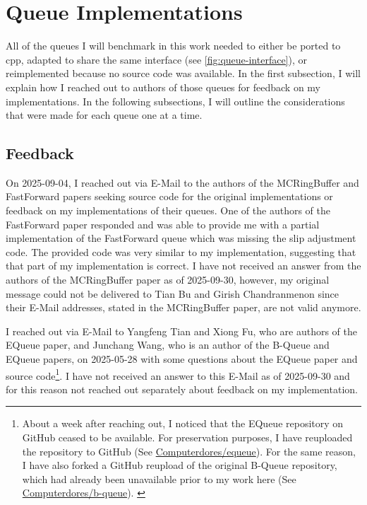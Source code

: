 \chapter{Queue Implementations}
All of the queues I will benchmark in this work needed to either be ported to cpp, adapted to share the same
interface (see \autoref{fig:queue-interface}), or reimplemented because no source code was available.
In the first subsection, I will explain how I reached out to authors of those queues for feedback on my implementations.
In the following subsections, I will outline the considerations that were made for each queue one at a time.

\section{Feedback}
On 2025-09-04, I reached out via E-Mail to the authors of the MCRingBuffer and FastForward papers seeking
source code for the original implementations or feedback on my implementations of their queues.
One of the authors of the FastForward paper responded and was able to provide me with a partial
implementation of the FastForward queue which was missing the slip adjustment code.
The provided code was very similar to my implementation, suggesting that that part of my implementation is correct.
I have not received an answer from the authors of the MCRingBuffer paper as of 2025-09-30, however, my
original message could not be delivered to Tian Bu and Girish Chandranmenon since their E-Mail addresses,
stated in the MCRingBuffer paper, are not valid anymore.

I reached out via E-Mail to Yangfeng Tian and Xiong Fu, who are authors of the EQueue paper, and Junchang
Wang, who is an author of the B-Queue and EQueue papers, on 2025-05-28 with some questions about the EQueue
paper and source code\footnote{About a week after reaching out,
    I noticed that the EQueue repository on GitHub ceased to be available.
    For preservation purposes, I have reuploaded the repository to GitHub (See
    \href{https://github.com/Computerdores/equeue}{Computerdores/equeue}).
    For the same reason, I have also forked a GitHub reupload of the original B-Queue
    repository, which had already been unavailable prior to my work here (See
    \href{https://github.com/Computerdores/b-queue}{Computerdores/b-queue}).
\label{equeue-bqueue-links}}.
I have not received an answer to this E-Mail as of 2025-09-30 and for this reason not reached out separately
about feedback on my implementation.


